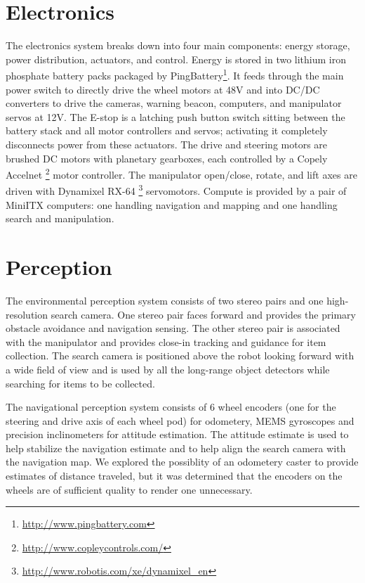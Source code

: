 \documentclass[12pt]{article}
\begin{document}
\section{Electronics}\label{Electronics}

The electronics system breaks down into four main components: energy storage, power distribution, actuators, and control. Energy is stored in two lithium iron phosphate battery packs packaged by PingBattery\footnote{\url{http://www.pingbattery.com}}. It feeds through the main power switch to directly drive the wheel motors at 48V and into DC/DC converters to drive the cameras, warning beacon, computers, and manipulator servos at 12V. The E-stop is a latching push button switch sitting between the battery stack and all motor controllers and servos; activating it completely disconnects power from these actuators. The drive and steering motors are brushed DC motors with planetary gearboxes, each controlled by a Copely Accelnet \footnote{\url{http://www.copleycontrols.com/}} motor controller. The manipulator open/close, rotate, and lift axes are driven with Dynamixel RX-64 \footnote{\url{http://www.robotis.com/xe/dynamixel_en}} servomotors. Compute is provided by a pair of MiniITX computers: one handling navigation and mapping and one handling search and manipulation.

\section{Perception}\label{Perception}
The environmental perception system consists of two stereo pairs and one high-resolution search camera. One stereo pair faces forward and provides the primary obstacle avoidance and navigation sensing. The other stereo pair is associated with the manipulator and provides close-in tracking and guidance for item collection. The search camera is positioned above the robot looking forward with a wide field of view and is used by all the long-range object detectors while searching for items to be collected.

The navigational perception system consists of 6 wheel encoders (one for the steering and drive axis of each wheel pod) for odometery, MEMS gyroscopes and precision inclinometers for attitude estimation. The attitude estimate is used to help stabilize the navigation estimate and to help align the search camera with the navigation map. We explored the possiblity of an odometery caster to provide estimates of distance traveled, but it was determined that the encoders on the wheels are of sufficient quality to render one unnecessary.
\end{document}
